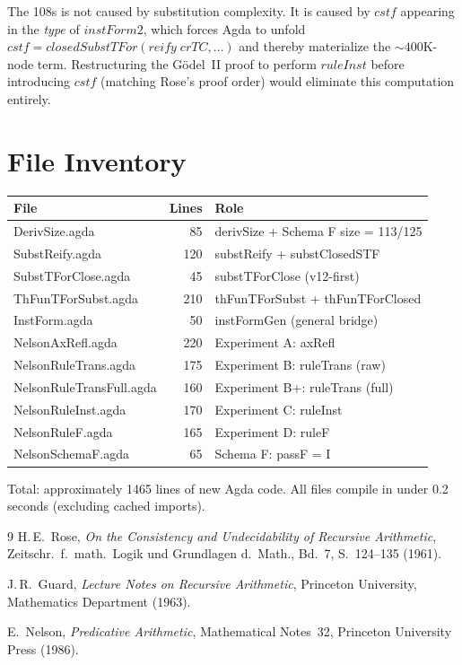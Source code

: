 \documentclass[11pt]{article}
\begin{document}
The 108s is not caused by substitution complexity. It is caused by
$\mathit{cstf}$ appearing in the \emph{type} of $\mathit{instForm2}$,
which forces Agda to unfold $\mathit{cstf} =
\mathit{closedSubstTFor}(\mathit{reify}\;\mathit{crTC}, \ldots)$ and
thereby materialize the ${\sim}400$K-node term. Restructuring the
G\"odel~II proof to perform $\mathit{ruleInst}$ before introducing
$\mathit{cstf}$ (matching Rose's proof order) would eliminate this
computation entirely.

\section{File Inventory}

\begin{center}
\begin{tabular}{lrl}
\hline
\textbf{File} & \textbf{Lines} & \textbf{Role} \\
\hline
DerivSize.agda & 85 & derivSize + Schema F size = 113/125 \\
SubstReify.agda & 120 & substReify + substClosedSTF \\
SubstTForClose.agda & 45 & substTForClose (v12-first) \\
ThFunTForSubst.agda & 210 & thFunTForSubst + thFunTForClosed \\
InstForm.agda & 50 & instFormGen (general bridge) \\
NelsonAxRefl.agda & 220 & Experiment A: axRefl \\
NelsonRuleTrans.agda & 175 & Experiment B: ruleTrans (raw) \\
NelsonRuleTransFull.agda & 160 & Experiment B+: ruleTrans (full) \\
NelsonRuleInst.agda & 170 & Experiment C: ruleInst \\
NelsonRuleF.agda & 165 & Experiment D: ruleF \\
NelsonSchemaF.agda & 65 & Schema F: passF = I \\
\hline
\end{tabular}
\end{center}

Total: approximately 1465 lines of new Agda code. All files compile in
under 0.2 seconds (excluding cached imports).

\begin{thebibliography}{9}
 H.\,E.\ Rose,
\emph{On the Consistency and Undecidability of Recursive Arithmetic},
Zeitschr.\ f.\ math.\ Logik und Grundlagen d.\ Math., Bd.~7,
S.~124--135 (1961).

 J.\,R.\ Guard,
\emph{Lecture Notes on Recursive Arithmetic},
Princeton University, Mathematics Department (1963).

 E.\ Nelson,
\emph{Predicative Arithmetic},
Mathematical Notes~32, Princeton University Press (1986).
\end{thebibliography}
\end{document}
